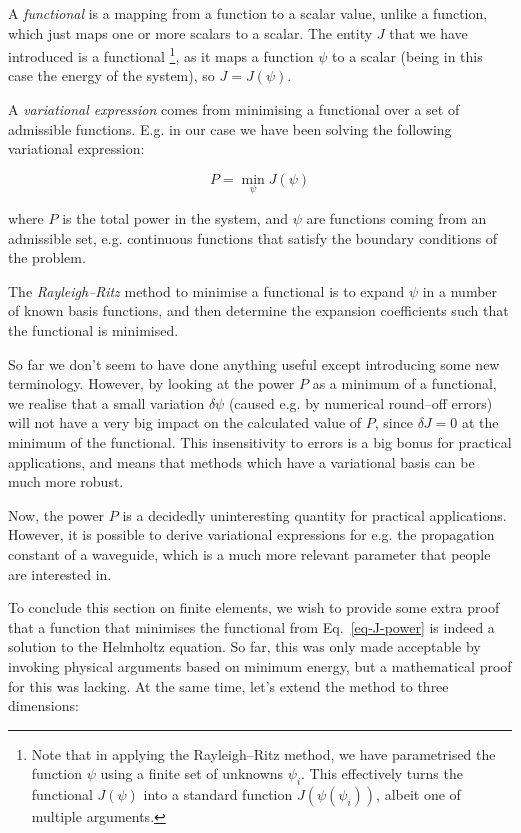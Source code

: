 A \emph{functional} is a mapping from a function to a scalar value, unlike a function, which just maps one or more scalars to a scalar. The entity $J$ that we have introduced is a functional \footnote{Note that in applying the Rayleigh--Ritz method, we have parametrised the function $\psi$ using a finite set of unknowns $\psi_i$. This effectively turns the functional $J(\psi)$ into a standard function $J(\psi(\psi_i))$, albeit one of multiple arguments.}, as it maps a function $\psi$ to a scalar (being in this case the energy of the system), so $J=J(\psi)$.

A \emph{variational expression} comes from minimising a functional over a set of admissible functions. E.g. in our case we have been solving the following variational expression:

\begin{equation}
P = \min_\psi J(\psi)
\end{equation} 

where $P$ is the total power in the system, and $\psi$ are functions coming from an admissible set, e.g. continuous functions that satisfy the boundary conditions of the problem.

The \emph{Rayleigh--Ritz} method to minimise a functional is to expand $\psi$ in a number of known basis functions, and then determine the expansion coefficients such that the functional is minimised.

So far we don't seem to have done anything useful except introducing some new terminology. However, by looking at the power $P$ as a minimum of a functional, we realise that a small variation $\delta \psi$ (caused e.g. by numerical round--off errors) will not have a very big impact on the calculated value of $P$, since $\delta J=0$ at the minimum of the functional. This insensitivity to errors is a big bonus for practical applications, and means that methods which have a variational basis can be much more robust.

Now, the power $P$ is a decidedly uninteresting quantity for practical applications. However, it is possible to derive variational expressions for e.g. the propagation constant of a waveguide, which is a much more relevant parameter that people are interested in.

To conclude this section on finite elements, we wish to provide some extra proof that a function that minimises the functional from Eq.~\ref{eq-J-power} is indeed a solution to the Helmholtz equation. So far, this was only made acceptable by invoking physical arguments based on minimum energy, but a mathematical proof for this was lacking. At the same time, let's extend the method to three dimensions:


